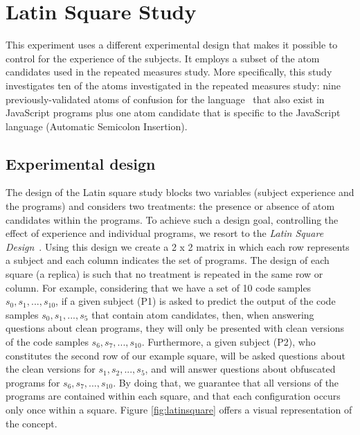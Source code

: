 \section{Latin Square Study}\label{sec:s02}

This experiment uses a different experimental design that makes it possible to control for the experience of the subjects. It employs a subset of the atom candidates used in the repeated measures study. More specifically, this study investigates ten of the atoms investigated in the repeated measures study: 
nine previously-validated atoms of confusion for the \clang language~\cite{DBLP:conf/sigsoft/GopsteinIYDZYC17} that also exist in JavaScript programs plus one atom candidate that is specific to the JavaScript language (Automatic Semicolon Insertion). 

\subsection{Experimental design} 

The design of the Latin square study blocks two variables (subject experience and the programs) and considers two treatments: the presence or absence of atom candidates within the programs. To achieve such a design goal, controlling the effect of experience and individual programs, we resort to the \textit{Latin Square Design}~\cite{Hunter-Experimenters}. Using this design we create a 2 x 2 matrix in which each row represents a subject and each column indicates the set of programs. The design of each square (a replica) is such that no treatment is repeated in the same row or column. For example, considering that we have a set of 10
code samples $s_0, s_1, ..., s_{10}$, if a given subject (P1) is asked to predict the output of the code samples $s_0, s_1, ..., s_5$ that contain atom candidates, then, when answering questions about clean programs, they will only be presented with clean versions of the code samples $s_6, s_7,..., s_{10}$. Furthermore, a given subject (P2), who constitutes the second row of our example square, will be asked questions about the clean versions for $s_1, s_2, ..., s_5$, and will answer questions about obfuscated programs for $s_6, s_7,..., s_{10}$. By doing that, we guarantee that all versions of the programs are contained within each square, and that each configuration occurs only once within a square. Figure \ref{fig:latinsquare} offers a visual representation of the concept.

